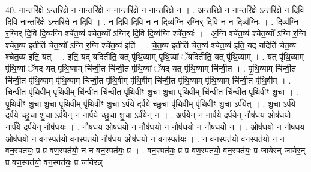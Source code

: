\documentclass[17pt]{extarticle}
\begin{document}
40. नान्तरि॑क्षे॒ ऽन्तरि॑क्षे॒ न नान्तरि॑क्षे॒ न नान्तरि॑क्षे॒ न नान्तरि॑क्षे॒ न । . अ॒न्तरि॑क्षे॒ न नान्तरि॑क्षे॒ ऽन्तरि॑क्षे॒ न दि॒वि दि॒वि नान्तरि॑क्षे॒ ऽन्तरि॑क्षे॒ न दि॒वि । . न दि॒वि दि॒वि न न दि॒व्य॑ग्नि र॒ग्निर् दि॒वि न न दि॒व्य॑ग्निः । . दि॒व्य॑ग्नि र॒ग्निर् दि॒वि दि॒व्य॑ग्नि श्चे॑त॒व्य॑ श्चेत॒व्यो᳚ ऽग्निर् दि॒वि दि॒व्य॑ग्नि श्चे॑त॒व्यः॑ । . अ॒ग्नि श्चे॑त॒व्य॑ श्चेत॒व्यो᳚ ऽग्नि र॒ग्नि श्चे॑त॒व्य॑ इतीति॑ चेत॒व्यो᳚ ऽग्नि र॒ग्नि श्चे॑त॒व्य॑ इति॑ । . चे॒त॒व्य॑ इतीति॑ चेत॒व्य॑ श्चेत॒व्य॑ इति॒ यद् यदिति॑ चेत॒व्य॑ श्चेत॒व्य॑ इति॒ यत् । . इति॒ यद् यदितीति॒ यत् पृ॑थि॒व्याम् पृ॑थि॒व्यां ॅयदितीति॒ यत् पृ॑थि॒व्याम् । . यत् पृ॑थि॒व्याम् पृ॑थि॒व्यां ॅयद् यत् पृ॑थि॒व्याम् चि॑न्वी॒त चि॑न्वी॒त पृ॑थि॒व्यां ॅयद् यत् पृ॑थि॒व्याम् चि॑न्वी॒त । . पृ॒थि॒व्याम् चि॑न्वी॒त चि॑न्वी॒त पृ॑थि॒व्याम् पृ॑थि॒व्याम् चि॑न्वी॒त पृ॑थि॒वीम् पृ॑थि॒वीम् चि॑न्वी॒त पृ॑थि॒व्याम् पृ॑थि॒व्याम् चि॑न्वी॒त पृ॑थि॒वीम् । . चि॒न्वी॒त पृ॑थि॒वीम् पृ॑थि॒वीम् चि॑न्वी॒त चि॑न्वी॒त पृ॑थि॒वीꣳ शु॒चा शु॒चा पृ॑थि॒वीम् चि॑न्वी॒त चि॑न्वी॒त पृ॑थि॒वीꣳ शु॒चा । . पृ॒थि॒वीꣳ शु॒चा शु॒चा पृ॑थि॒वीम् पृ॑थि॒वीꣳ शु॒चा ऽर्प॑ये दर्पये च्छु॒चा पृ॑थि॒वीम् पृ॑थि॒वीꣳ शु॒चा ऽर्प॑येत् । . शु॒चा ऽर्प॑ये दर्पये च्छु॒चा शु॒चा ऽर्प॑ये॒न् न नार्प॑ये च्छु॒चा शु॒चा ऽर्प॑ये॒न् न । . अ॒र्प॒ये॒न् न नार्प॑ये दर्पये॒न् नौष॑धय॒ ओष॑धयो॒ नार्प॑ये दर्पये॒न् नौष॑धयः । . नौष॑धय॒ ओष॑धयो॒ न नौष॑धयो॒ न नौष॑धयो॒ न नौष॑धयो॒ न । . ओष॑धयो॒ न नौष॑धय॒ ओष॑धयो॒ न वन॒स्पत॑यो॒ वन॒स्पत॑यो॒ नौष॑धय॒ ओष॑धयो॒ न वन॒स्पत॑यः । . न वन॒स्पत॑यो॒ वन॒स्पत॑यो॒ न न वन॒स्पत॑यः॒ प्र प्र वण॒स्पत॑यो॒ न न वन॒स्पत॑यः॒ प्र । . वन॒स्पत॑यः॒ प्र प्र वण॒स्पत॑यो॒ वन॒स्पत॑यः॒ प्र जा॑येरन् जायेर॒न् प्र वण॒स्पत॑यो॒ वन॒स्पत॑यः॒ प्र जा॑येरन्न् । \newline
\pagebreak
{}
\end{document}
